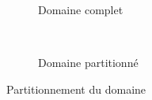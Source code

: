 \documentclass{beamer}
\begin{document}
\begin{frame}
  \begin{figure}[!ht]
  \centering
  \begin{subfigure}[b]{0.5\textwidth}
    \centering
  \caption{\label{fig:globaldom}Domaine complet}
  \end{subfigure}%
  ~
  \begin{subfigure}[b]{0.5\textwidth}
    \centering
  \caption{\label{fig:partdom}Domaine partitionné}
  \end{subfigure}
  \caption{\label{fig:dom}Partitionnement du domaine}
\end{figure}
\end{frame}
\end{document}

